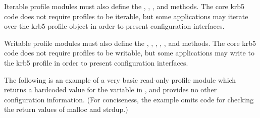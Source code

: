 \documentclass[letterpaper,10pt,english]{sphinxmanual}
\begin{document}
Iterable profile modules must also define the ,
, , and  methods.  The
core krb5 code does not require profiles to be iterable, but some
applications may iterate over the krb5 profile object in order to
present configuration interfaces.

Writable profile modules must also define the ,
, , ,
, and  methods.  The core krb5 code does not
require profiles to be writable, but some applications may write to
the krb5 profile in order to present configuration interfaces.

The following is an example of a very basic read-only profile module
which returns a hardcoded value for the  variable in
, and provides no other configuration information.
(For conciseness, the example omits code for checking the return
values of malloc and strdup.)
\end{document}
